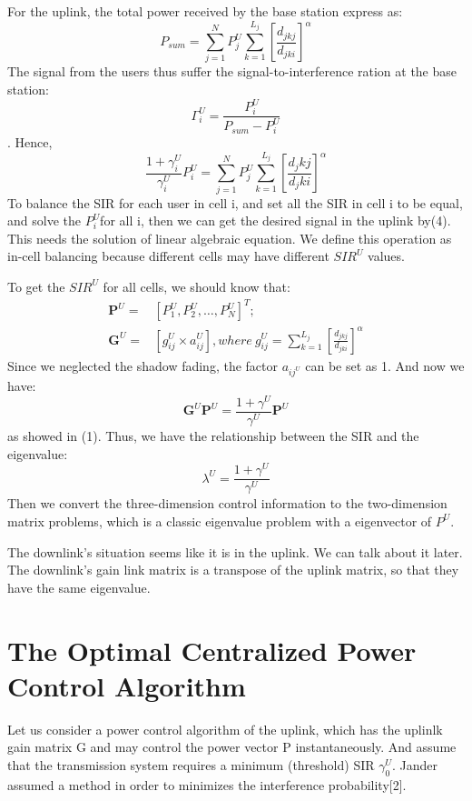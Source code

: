 \documentclass[conference]{IEEEtran}
\begin{document}
For the uplink, the total power received by the base station express as:\begin{equation}
P_{sum} = \sum_{j=1}^N P_j^U \sum_{k=1}^{L_j} \left[ \frac{d_{jkj}}{d_{jki}}\right] ^{\alpha}
\end{equation}
The signal from the users thus suffer the signal-to-interference ration at the base station:
\begin{equation*}
\Gamma_i^U = \frac{P_i^U}{P_{sum}-P_i^U}
\end{equation*}.
Hence,
\begin{equation}
\frac{1+\gamma_i^U}{\gamma_i^U}P_i^U = \sum_{j=1}^N P_j^U \sum_{k=1}^{L_j} \left[\frac{d_jkj}{d_jki}\right] ^{\alpha}
\end{equation}
To balance the SIR for each user in cell i, and set all the SIR  in cell i to be equal, and solve the $P_i^U$for all i, then we can get the desired signal in the uplink by(4). This needs the solution of linear algebraic equation. We define this operation as in-cell balancing because different cells may have different $SIR^U$ values.

To get the $SIR^U$ for all cells, we should know that:
\begin{align}
\bm {P}^U =& \left[ P^U_1, P^U_2,\dots,P^U_N \right]^T; \nonumber \\
\bm {G}^U =& \left[ g^U_{ij}\times a_{ij}^U\right], where \ g^U_{ij} = \sum_{k=1}^{L_j} \left[ \frac{d_{jkj}}{d_{jki}}\right] ^{\alpha}
\end{align}
Since we neglected the shadow fading, the factor $a_{ij^U}$ can be set as 1. And now we have:
\begin{equation}
\bm G^U\bm P^U = \frac{1+\gamma^U}{\gamma^U}\bm P^U
\end{equation}
as showed in (1).
Thus, we have the relationship between the SIR and the eigenvalue:
\begin{equation}
\lambda^U = \frac{1+\gamma^U}{\gamma^U}
\end{equation}
Then we convert the three-dimension control information to the two-dimension matrix problems, which is a classic eigenvalue problem with a eigenvector of $P^U$. 

The downlink's situation seems like it is in the uplink. We can talk about it later. The downlink's gain link matrix is a transpose of the uplink matrix, so that they have the same eigenvalue. 


\section{The Optimal Centralized Power Control Algorithm}
Let us consider a power control algorithm of the uplink, which has the uplinlk gain matrix G and may control the power vector P instantaneously. And assume that the transmission system requires a minimum (threshold) SIR $\gamma_0^U$. Jander assumed a method in order to minimizes the interference probability[2].
\end{document}
